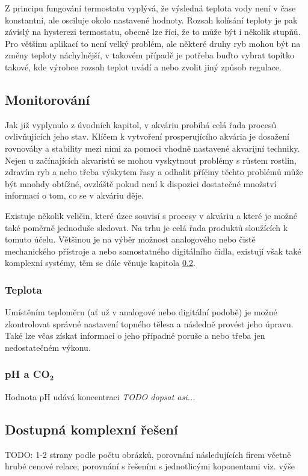         Z principu fungování termostatu vyplývá, že výsledná teplota vody není v čase konstantní, ale osciluje okolo nastavené hodnoty. Rozsah kolísání teploty je pak závislý na hysterezi termostatu, obecně lze říci, že to může být i několik stupňů. Pro většinu aplikací to není velký problém, ale některé druhy ryb mohou být na změny teploty náchylnější, v takovém případě je potřeba buďto vybrat topítko takové, kde výrobce rozsah teplot uvádí a nebo zvolit jiný způsob regulace. 

    \subsection{Monitorování}
        Jak již vyplynulo z úvodních kapitol, v akváriu probíhá celá řada procesů ovlivňujících jeho stav. Klíčem k vytvoření prosperujícího akvária je dosažení rovnováhy a stability mezi nimi za pomoci vhodně nastavené akvarijní techniky. Nejen u začínajících akvaristů se mohou vyskytnout problémy s růstem rostlin, zdravím ryb a nebo třeba výskytem řasy a odhalit příčiny těchto problémů může být mnohdy obtížné, ovzláště pokud není k dispozici dostatečné množství informací o tom, co se v akváriu děje. 
        
        Existuje několik veličin, které úzce souvisí s procesy v akváriu a které je možné také poměrně jednoduše sledovat. Na trhu je celá řada produktů sloužících k tomuto účelu. Většinou je na výběr možnost analogového nebo čistě mechanického přístroje a nebo samostatného digitálního čidla, existují však také komplexní systémy, těm se dále věnuje kapitola  \ref{lab:kapitola-komplexni-reseni}. 

        \subsubsection{Teplota}
            Umístěním teploměru (ať už v analogové nebo digitální podobě) je možné zkontrolovat správné nastavení topného tělesa a následně provést jeho úpravu. Také lze včas získat informaci o jeho případné poruše a nebo třeba jen nedostatečném výkonu. 
        \subsubsection{pH a CO\(\mathbf{_{2}}\)}
            Hodnota pH udává koncentraci \textit{TODO dopsat asi...} 

             
    \subsection{Dostupná komplexní řešení}
    \label{lab:kapitola-komplexni-reseni}
    TODO: 1-2 strany podle počtu obrázků, porovnání následujících firem včetně hrubé cenové relace; porovnání s řešením s jednotlicými koponentami viz. výše
